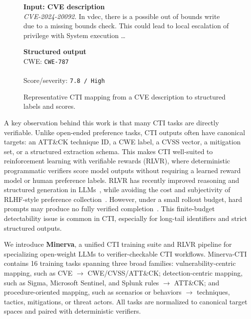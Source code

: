 \begin{figure}[t]
\centering
\begin{tcolorbox}[
  width=0.92\linewidth,
  title={Representative CTI mapping},
  fonttitle=\bfseries\footnotesize
]
\footnotesize
\begin{minipage}[t]{0.57\linewidth}
\textbf{Input: CVE description}\\[-1mm]
\emph{CVE-2024-20092.} In vdec, there is a possible out of bounds write due to a missing bounds check. This could lead to local escalation of privilege with System execution \ldots{}
\end{minipage}
\hfill
\begin{minipage}[t]{0.38\linewidth}
\textbf{Structured output}\\[-1mm]
CWE: \texttt{CWE-787}\\
\\
Score/severity: \texttt{7.8 / High}
\end{minipage}
\end{tcolorbox}
\caption{Representative CTI mapping from a CVE description to structured labels and scores.}
\label{fig:cti-mapping-example}
\end{figure}

A key observation behind this work is that many CTI tasks are directly verifiable. Unlike open-ended preference tasks, CTI outputs often have canonical targets: an ATT\&CK technique ID, a CWE label, a CVSS vector, a mitigation set, or a structured extraction schema. This makes CTI well-suited to reinforcement learning with verifiable rewards (RLVR), where deterministic programmatic verifiers score model outputs without requiring a learned reward model or human preference labels. RLVR has recently improved reasoning and structured generation in LLMs~\citep{shao2024deepseekmath,deepseekr1,wen2025rlvr}, while avoiding the cost and subjectivity of RLHF-style preference collection~\citep{ouyang2022training}. However, under a small rollout budget, hard prompts may produce no fully verified completion~\citep{wu2025invisibleleash}. This finite-budget detectability issue is common in CTI, especially for long-tail identifiers and strict structured outputs.

We introduce \textbf{Minerva}, a unified CTI training suite and RLVR pipeline for specializing open-weight LLMs to verifier-checkable CTI workflows. Minerva-CTI contains 16 training tasks spanning three broad families: vulnerability-centric mapping, such as CVE $\rightarrow$ CWE/CVSS/ATT\&CK; detection-centric mapping, such as Sigma, Microsoft Sentinel, and Splunk rules $\rightarrow$ ATT\&CK; and procedure-oriented mapping, such as scenarios or behaviors $\rightarrow$ techniques, tactics, mitigations, or threat actors. All tasks are normalized to canonical target spaces and paired with deterministic verifiers.

